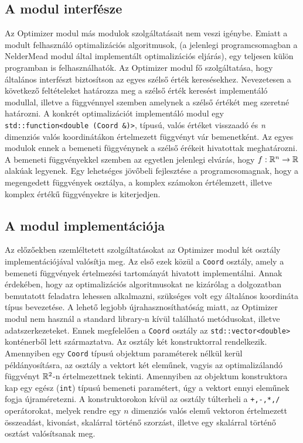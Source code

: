\documentclass[oneside,titlepage,12pt,a4paper]{report}
\begin{document}
\subsection*{A modul interfésze}

\par Az Optimizer modul más modulok szolgáltatásait nem veszi igénybe. Emiatt a modult felhasználó optimalizációs algoritmusok, (a jelenlegi programcsomagban a NelderMead modul által implementált optimalizációs eljárás), egy teljesen külön programban is felhasználhatók. Az Optimizer modul fő szolgáltatása, hogy általános interfészt biztosítson az egyes szélső érték keresésekhez. Nevezetesen a következő feltételeket határozza meg a szélső érték keresést implementáló modullal, illetve a függvénnyel szemben amelynek a szélső értékét meg szeretné határozni. A konkrét optimalizációt implementáló modul egy \texttt{std::function<double (Coord \&)>}, típusú, valós értéket visszaadó és \textit{n} dimenziós valós koordinátákon értelmezett függvényt vár bemenetként. Az egyes modulok ennek a bemeneti függvénynek a szélső érékeit hivatottak meghatározni. A bemeneti függvényekkel szemben az egyetlen jelenlegi elvárás, hogy $f : \Bbb R^n \to \Bbb R$ alakúak legyenek. Egy lehetséges jövőbeli fejlesztése a programcsomagnak, hogy a megengedett függvények osztálya, a komplex számokon értélemzett, illetve komplex értékű függvényekre is kiterjedjen.

\subsection*{A modul implementációja}

\par Az előzőekben szemléltetett szolgáltatásokat az Optimizer modul két osztály implementációjával valósítja meg. Az első ezek közül a \texttt{Coord} osztály, amely a bemeneti függvények értelmezési tartományát hivatott implementálni. Annak érdekében, hogy az optimalizációs algoritmusokat ne kizárólag a dolgozatban bemutatott feladatra lehessen alkalmazni, szükséges volt egy általános koordináta típus bevezetése. A lehető legjobb újrahasznosíthatóság miatt, az Optimizer modul nem használ a standard library-n kívül található metódusokat, illetve adatszerkezeteket. Ennek megfelelően a \texttt{Coord} osztály az \texttt{std::vector<double>} konténerből lett származtatva. Az osztály két konstruktorral rendelkezik. Amennyiben egy \texttt{Coord} típusú objektum paraméterek nélkül kerül példányosításra, az osztály a vektort két eleműnek, vagyis az optimalizálandó függvényt $ \Bbb R^2 $-n értelmezettnek tekinti. Amennyiben az objektum konstruktora kap egy egész (\texttt{int}) típusú bemeneti paramétert, úgy a vektort ennyi eleműnek fogja újraméretezni. A konstruktorokon kívül az osztály túlterheli a \texttt{+,-,*,/} operátorokat, melyek rendre egy $n$ dimenziós valós elemű vektoron értelmezett összeadást, kivonást, skalárral történő szorzást, illetve egy skalárral történő osztást valósítsanak meg.       
\end{document}
